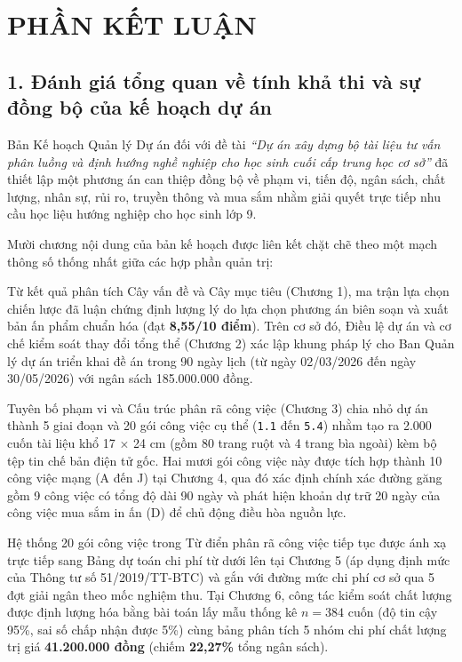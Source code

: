 \section{PHẦN KẾT LUẬN}

\subsection{1. Đánh giá tổng quan về tính khả thi và sự đồng bộ của kế hoạch dự án}

Bản Kế hoạch Quản lý Dự án đối với đề tài \textit{``Dự án xây dựng bộ tài liệu tư vấn phân luồng và định hướng nghề nghiệp cho học sinh cuối cấp trung học cơ sở''} đã thiết lập một phương án can thiệp đồng bộ về phạm vi, tiến độ, ngân sách, chất lượng, nhân sự, rủi ro, truyền thông và mua sắm nhằm giải quyết trực tiếp nhu cầu học liệu hướng nghiệp cho học sinh lớp 9.

Mười chương nội dung của bản kế hoạch được liên kết chặt chẽ theo một mạch thông số thống nhất giữa các hợp phần quản trị:

Từ kết quả phân tích Cây vấn đề và Cây mục tiêu (Chương 1), ma trận lựa chọn chiến lược đã luận chứng định lượng lý do lựa chọn phương án biên soạn và xuất bản ấn phẩm chuẩn hóa (đạt \textbf{8,55/10 điểm}). Trên cơ sở đó, Điều lệ dự án và cơ chế kiểm soát thay đổi tổng thể (Chương 2) xác lập khung pháp lý cho Ban Quản lý dự án triển khai đề án trong 90 ngày lịch (từ ngày 02/03/2026 đến ngày 30/05/2026) với ngân sách 185.000.000 đồng.

Tuyên bố phạm vi và Cấu trúc phân rã công việc (Chương 3) chia nhỏ dự án thành 5 giai đoạn và 20 gói công việc cụ thể (\texttt{1.1} đến \texttt{5.4}) nhằm tạo ra 2.000 cuốn tài liệu khổ 17 $\times$ 24 cm (gồm 80 trang ruột và 4 trang bìa ngoài) kèm bộ tệp tin chế bản điện tử gốc. Hai mươi gói công việc này được tích hợp thành 10 công việc mạng (A đến J) tại Chương 4, qua đó xác định chính xác đường găng gồm 9 công việc có tổng độ dài 90 ngày và phát hiện khoản dự trữ 20 ngày của công việc mua sắm in ấn (D) để chủ động điều hòa nguồn lực.

Hệ thống 20 gói công việc trong Từ điển phân rã công việc tiếp tục được ánh xạ trực tiếp sang Bảng dự toán chi phí từ dưới lên tại Chương 5 (áp dụng định mức của Thông tư số 51/2019/TT-BTC) và gắn với đường mức chi phí cơ sở qua 5 đợt giải ngân theo mốc nghiệm thu. Tại Chương 6, công tác kiểm soát chất lượng được định lượng hóa bằng bài toán lấy mẫu thống kê $n = 384$ cuốn (độ tin cậy 95\%, sai số chấp nhận được 5\%) cùng bảng phân tích 5 nhóm chi phí chất lượng trị giá \textbf{41.200.000 đồng} (chiếm \textbf{22,27\%} tổng ngân sách).

